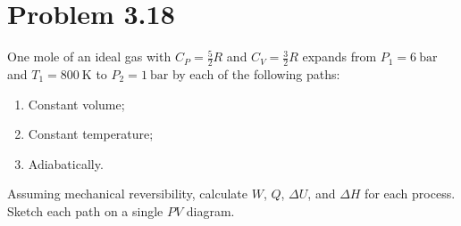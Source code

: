 \documentclass{article}
\begin{document}
\section*{Problem 3.18}
One mole of an ideal gas with $C_P = \frac{5}{2}R$ and $C_V =
\frac{3}{2}R$ expands from $P_1 = \SI{6}{\bar}$ and $T_1 =
\SI{800}{\kelvin}$ to $P_2 = \SI{1}{\bar}$ by each of the following paths:
\begin{enumerate}[label=(\alph*)]
  \item Constant volume;
  \item Constant temperature;
  \item Adiabatically.
\end{enumerate}
Assuming mechanical reversibility, calculate $W$, $Q$, $\Delta U$,
and $\Delta H$ for each process. Sketch each path on a single $PV$ diagram.
\end{document}
